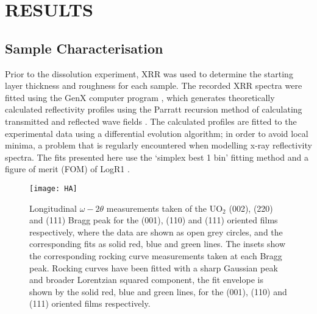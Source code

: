 \documentclass[twocolumn,prl,nobalancelastpage,aps,10pt]{revtex4-1}
\begin{document}
\section{RESULTS}
\subsection{Sample Characterisation}

Prior to the dissolution experiment, XRR was used to determine the starting layer thickness and roughness for each sample. The recorded XRR spectra were fitted using the GenX computer program \cite{Bjorck2007}, which generates theoretically calculated reflectivity profiles using the Parratt recursion method of calculating transmitted and reflected wave fields \cite{Parratt1954}. The calculated profiles are fitted to the experimental data using a differential evolution algorithm; in order to avoid local minima, a problem that is regularly encountered when modelling x-ray reflectivity spectra. The fits presented here use the `simplex best 1 bin' fitting method and a figure of merit (FOM) of LogR1 \cite{Bjorck2007}.

\begin{figure}[h]
	\centering
	\texttt{[image: HA]}
	\caption{Longitudinal $\omega - 2\theta$ measurements taken of the UO$_2$ (002), (220) and (111) Bragg peak for the (001), (110) and (111) oriented films respectively, where the data are shown as open grey circles, and the corresponding fits as solid  red, blue and green lines. The insets show the corresponding rocking curve measurements taken at each Bragg peak. Rocking curves have been fitted with a sharp Gaussian peak and broader Lorentzian squared component, the fit envelope is shown by the solid red, blue and green lines, for the (001), (110) and (111) oriented films respectively.}
	\label{fig:ctr_model}
\end{figure}
\end{document}
